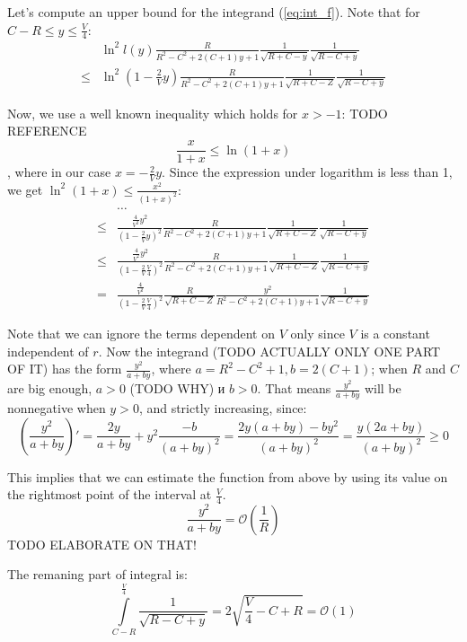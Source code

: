 \documentclass[12pt, a4paper]{article}
\theoremstyle{plain}
\newcommand{\mcO}{\mathcal{O}} %
\begin{document}
Let's compute an upper bound for the integrand (\ref{eq:int_f}). Note that for $C - R \le y \le \frac{V}{4}$:
\begin{align*}
       & \ln^2 l(y) \frac{R}{R^2 - C^2 + 2 (C + 1) y + 1} \frac{1}{\sqrt{R + C - y}} \frac{1}{\sqrt{R - C + y}}
\\ \le & \ln^2 (1 - \frac{2}{V} y) \frac{R}{R^2 - C^2 + 2 (C + 1) y + 1} \frac{1}{\sqrt{R + C - Z}} \frac{1}{\sqrt{R - C + y}}
\end{align*}

Now, we use a well known inequality which holds for $x > -1$: TODO REFERENCE
\[
\frac{x}{1 + x} \le \ln (1 + x)
\]
, where in our case $x = -\frac{2}{V} y$. Since the expression under logarithm is less than 1, we get $\ln^2 (1 + x) \le \frac{x^2}{(1 + x)^2}$:
\begin{align*}
       & \dots 
\\ \le & \frac{\frac{4}{V^2}y^2}{(1 - \frac{2}{V}y)^2}  \frac{R}{R^2 - C^2 + 2 (C + 1) y + 1} \frac{1}{\sqrt{R + C - Z}} \frac{1}{\sqrt{R - C + y}}
\\ \le & \frac{\frac{4}{V^2}y^2}{(1 - \frac{2}{V} \frac{V}{4})^2}  \frac{R}{R^2 - C^2 + 2 (C + 1) y + 1} \frac{1}{\sqrt{R + C - Z}} \frac{1}{\sqrt{R - C + y}}
\\ = & \frac{\frac{4}{V^2}}{(1 - \frac{2}{V} \frac{V}{4})^2} \frac{R}{\sqrt{R + C - Z}} \frac{y^2}{R^2 - C^2 + 2 (C + 1) y + 1}  \frac{1}{\sqrt{R - C + y}}
\end{align*}

Note that we can ignore the terms dependent on $V$ only since $V$ is a constant independent of $r$. Now the integrand (TODO ACTUALLY ONLY ONE PART OF IT) has the form $\frac{y^2}{a + b y}$, where $a = R^2 - C^2 + 1, b = 2 (C + 1)$; when $R$ and $C$ are big enough, $a > 0$ (TODO WHY) и $b > 0$. That means $\frac{y^2}{a + b y}$ will be nonnegative when $y > 0$, and strictly increasing, since:
\[
  \left(\frac{y^2}{a + b y}\right)'
= \frac{2y}{a + by} + y^2 \frac{-b}{(a + by)^2}
= \frac{2y (a + by) - b y^2}{(a + by)^2}
= \frac{y (2a + by)}{(a + by)^2}
\ge 0
\]

This implies that we can estimate the function from above by using its value on the rightmost point of the interval at $\frac{V}{4}$.
\[
\frac{y^2}{a + b y} = \mcO\left(\frac{1}{R}\right)
\]
TODO ELABORATE ON THAT!

The remaning part of integral is:
\[
\int\limits_{C - R}^{\frac{V}{4}} \frac{1}{\sqrt{R - C + y}} = 2 \sqrt{\frac{V}{4} - C + R} = \mcO(1)
\]
\end{document}
